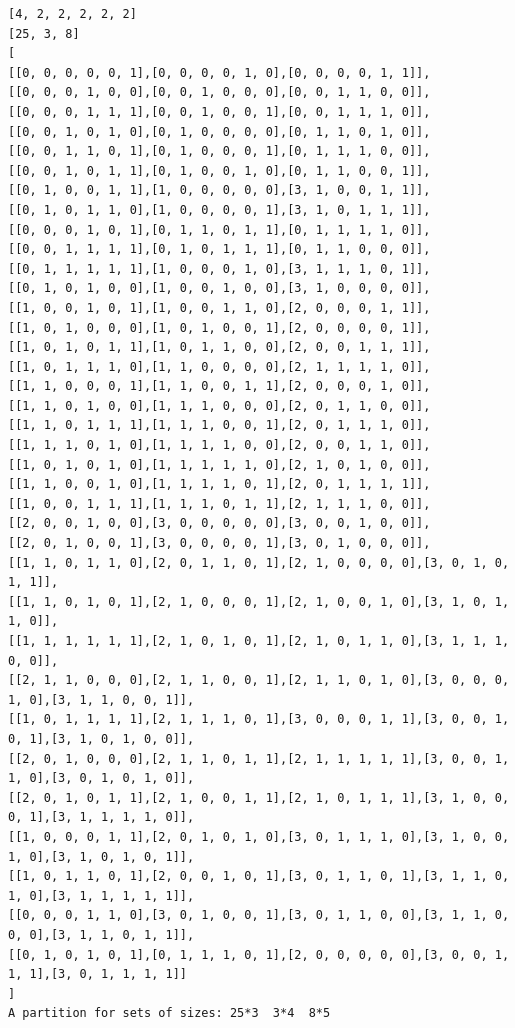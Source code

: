 \documentclass[final]{dmtcs-episciences}
\begin{document}
\begin{appendices}
\begin{verbatim} 
[4, 2, 2, 2, 2, 2]
[25, 3, 8]
[
[[0, 0, 0, 0, 0, 1],[0, 0, 0, 0, 1, 0],[0, 0, 0, 0, 1, 1]],
[[0, 0, 0, 1, 0, 0],[0, 0, 1, 0, 0, 0],[0, 0, 1, 1, 0, 0]],
[[0, 0, 0, 1, 1, 1],[0, 0, 1, 0, 0, 1],[0, 0, 1, 1, 1, 0]],
[[0, 0, 1, 0, 1, 0],[0, 1, 0, 0, 0, 0],[0, 1, 1, 0, 1, 0]],
[[0, 0, 1, 1, 0, 1],[0, 1, 0, 0, 0, 1],[0, 1, 1, 1, 0, 0]],
[[0, 0, 1, 0, 1, 1],[0, 1, 0, 0, 1, 0],[0, 1, 1, 0, 0, 1]],
[[0, 1, 0, 0, 1, 1],[1, 0, 0, 0, 0, 0],[3, 1, 0, 0, 1, 1]],
[[0, 1, 0, 1, 1, 0],[1, 0, 0, 0, 0, 1],[3, 1, 0, 1, 1, 1]],
[[0, 0, 0, 1, 0, 1],[0, 1, 1, 0, 1, 1],[0, 1, 1, 1, 1, 0]],
[[0, 0, 1, 1, 1, 1],[0, 1, 0, 1, 1, 1],[0, 1, 1, 0, 0, 0]],
[[0, 1, 1, 1, 1, 1],[1, 0, 0, 0, 1, 0],[3, 1, 1, 1, 0, 1]],
[[0, 1, 0, 1, 0, 0],[1, 0, 0, 1, 0, 0],[3, 1, 0, 0, 0, 0]],
[[1, 0, 0, 1, 0, 1],[1, 0, 0, 1, 1, 0],[2, 0, 0, 0, 1, 1]],
[[1, 0, 1, 0, 0, 0],[1, 0, 1, 0, 0, 1],[2, 0, 0, 0, 0, 1]],
[[1, 0, 1, 0, 1, 1],[1, 0, 1, 1, 0, 0],[2, 0, 0, 1, 1, 1]],
[[1, 0, 1, 1, 1, 0],[1, 1, 0, 0, 0, 0],[2, 1, 1, 1, 1, 0]],
[[1, 1, 0, 0, 0, 1],[1, 1, 0, 0, 1, 1],[2, 0, 0, 0, 1, 0]],
[[1, 1, 0, 1, 0, 0],[1, 1, 1, 0, 0, 0],[2, 0, 1, 1, 0, 0]],
[[1, 1, 0, 1, 1, 1],[1, 1, 1, 0, 0, 1],[2, 0, 1, 1, 1, 0]],
[[1, 1, 1, 0, 1, 0],[1, 1, 1, 1, 0, 0],[2, 0, 0, 1, 1, 0]],
[[1, 0, 1, 0, 1, 0],[1, 1, 1, 1, 1, 0],[2, 1, 0, 1, 0, 0]],
[[1, 1, 0, 0, 1, 0],[1, 1, 1, 1, 0, 1],[2, 0, 1, 1, 1, 1]],
[[1, 0, 0, 1, 1, 1],[1, 1, 1, 0, 1, 1],[2, 1, 1, 1, 0, 0]],
[[2, 0, 0, 1, 0, 0],[3, 0, 0, 0, 0, 0],[3, 0, 0, 1, 0, 0]],
[[2, 0, 1, 0, 0, 1],[3, 0, 0, 0, 0, 1],[3, 0, 1, 0, 0, 0]],
[[1, 1, 0, 1, 1, 0],[2, 0, 1, 1, 0, 1],[2, 1, 0, 0, 0, 0],[3, 0, 1, 0, 1, 1]],
[[1, 1, 0, 1, 0, 1],[2, 1, 0, 0, 0, 1],[2, 1, 0, 0, 1, 0],[3, 1, 0, 1, 1, 0]],
[[1, 1, 1, 1, 1, 1],[2, 1, 0, 1, 0, 1],[2, 1, 0, 1, 1, 0],[3, 1, 1, 1, 0, 0]],
[[2, 1, 1, 0, 0, 0],[2, 1, 1, 0, 0, 1],[2, 1, 1, 0, 1, 0],[3, 0, 0, 0, 1, 0],[3, 1, 1, 0, 0, 1]],
[[1, 0, 1, 1, 1, 1],[2, 1, 1, 1, 0, 1],[3, 0, 0, 0, 1, 1],[3, 0, 0, 1, 0, 1],[3, 1, 0, 1, 0, 0]],
[[2, 0, 1, 0, 0, 0],[2, 1, 1, 0, 1, 1],[2, 1, 1, 1, 1, 1],[3, 0, 0, 1, 1, 0],[3, 0, 1, 0, 1, 0]],
[[2, 0, 1, 0, 1, 1],[2, 1, 0, 0, 1, 1],[2, 1, 0, 1, 1, 1],[3, 1, 0, 0, 0, 1],[3, 1, 1, 1, 1, 0]],
[[1, 0, 0, 0, 1, 1],[2, 0, 1, 0, 1, 0],[3, 0, 1, 1, 1, 0],[3, 1, 0, 0, 1, 0],[3, 1, 0, 1, 0, 1]],
[[1, 0, 1, 1, 0, 1],[2, 0, 0, 1, 0, 1],[3, 0, 1, 1, 0, 1],[3, 1, 1, 0, 1, 0],[3, 1, 1, 1, 1, 1]],
[[0, 0, 0, 1, 1, 0],[3, 0, 1, 0, 0, 1],[3, 0, 1, 1, 0, 0],[3, 1, 1, 0, 0, 0],[3, 1, 1, 0, 1, 1]],
[[0, 1, 0, 1, 0, 1],[0, 1, 1, 1, 0, 1],[2, 0, 0, 0, 0, 0],[3, 0, 0, 1, 1, 1],[3, 0, 1, 1, 1, 1]]
]
A partition for sets of sizes: 25*3  3*4  8*5
\end{verbatim}
\newpage


\end{appendices}
\end{document}
